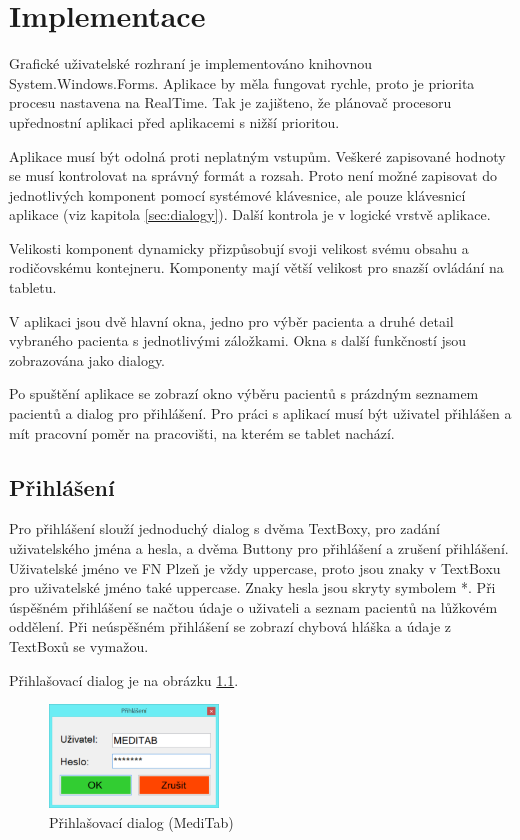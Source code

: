 \chapter{Implementace}
\label{ch:implementace}

Grafické uživatelské rozhraní je implementováno knihovnou System.Windows.Forms. Aplikace by měla fungovat rychle, proto je priorita procesu nastavena na RealTime. Tak je zajišteno, že plánovač procesoru upřednostní aplikaci před aplikacemi s nižší prioritou.

Aplikace musí být odolná proti neplatným vstupům. Veškeré zapisované hodnoty se musí kontrolovat na správný formát a rozsah. Proto není možné zapisovat do jednotlivých komponent pomocí systémové klávesnice, ale pouze klávesnicí aplikace (viz kapitola \ref{sec:dialogy}). Další kontrola je v logické vrstvě aplikace.

Velikosti komponent dynamicky přizpůsobují svoji velikost svému obsahu a rodičovskému kontejneru. Komponenty mají větší velikost pro snazší ovládání na tabletu.

V aplikaci jsou dvě hlavní okna, jedno pro výběr pacienta a druhé detail vybraného pacienta s jednotlivými záložkami. Okna s další funkčností jsou zobrazována jako dialogy.

Po spuštění aplikace se zobrazí okno výběru pacientů s prázdným seznamem pacientů a dialog pro přihlášení. Pro práci s aplikací musí být uživatel přihlášen a mít pracovní poměr na pracovišti, na kterém se tablet nachází.


\section{Přihlášení}

Pro přihlášení slouží jednoduchý dialog s dvěma TextBoxy, pro zadání uživatelského jména a hesla, a dvěma Buttony pro přihlášení a zrušení přihlášení. Uživatelské jméno ve FN Plzeň je vždy uppercase, proto jsou znaky v TextBoxu pro uživatelské jméno také uppercase. Znaky hesla jsou skryty symbolem *. Při úspěšném přihlášení se načtou údaje o uživateli a seznam pacientů na lůžkovém oddělení. Při neúspěšném přihlášení se zobrazí chybová hláška a údaje z TextBoxů se vymažou.

Přihlašovací dialog je na obrázku \ref{fig:login}.

\begin{figure}[H]
	\centering
	\includegraphics[width=0.4\textwidth]{img/meditab/login.eps}
	\caption{Přihlašovací dialog (MediTab)}
  \label{fig:login}
\end{figure}


